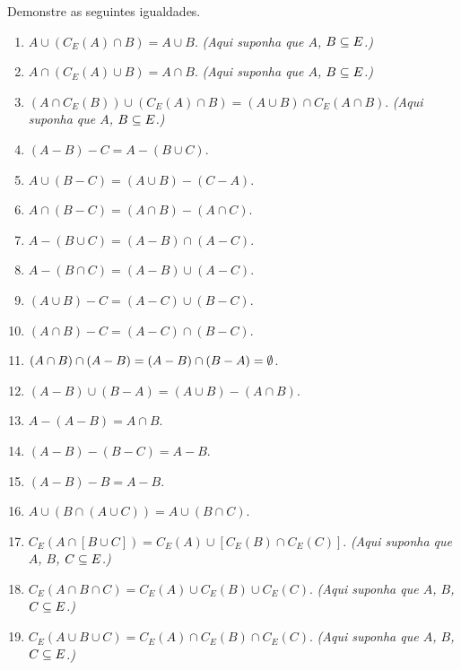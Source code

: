 \documentclass[12pt]{exam}
\begin{document}
\vspace{.3cm}

\questao{} Demonstre as seguintes igualdades.
\begin{enumerate}[label={\alph*})]
    \item $A \cup (C_E(A) \cap B) = A \cup B$. \textit{(Aqui suponha que $A$, $B \subseteq E$.)}

    \item $A \cap (C_E(A) \cup B) = A \cap B$. \textit{(Aqui suponha que $A$, $B \subseteq E$.)}

    \item $(A \cap C_E(B)) \cup (C_E(A) \cap B) = (A \cup B) \cap C_E(A \cap B)$. \textit{(Aqui suponha que $A$, $B \subseteq E$.)}
    \item $(A - B) - C = A - (B \cup C)$.

    \item $A \cup (B - C) = (A \cup B) - (C - A)$.

    \item $A \cap (B - C) = (A \cap B) - (A \cap C)$.

    \item $A - (B \cup C) = (A - B) \cap (A - C)$.

    \item $A - (B \cap C) = (A - B) \cup (A - C)$.

    \item $(A \cup B) - C = (A - C) \cup (B - C)$.

    \item $(A \cap B) - C = (A - C) \cap (B - C)$.

    \item $(A \cap B) \cap (A - B) = (A - B) \cap (B - A) = \emptyset$.

    \item $(A - B) \cup (B - A) = (A \cup B) - (A \cap B)$.

    \item $A - (A - B) = A \cap B$.

    \item $(A - B) - (B - C) = A - B$.

    \item $(A - B) - B = A - B$.

    \item $A \cup (B \cap (A \cup C)) = A \cup (B \cap C)$.

    \item $C_E( A \cap [B \cup C]) = C_E(A) \cup [C_E(B)\cap C_E(C)]$. \textit{(Aqui suponha que $A$, $B$, $C \subseteq E$.)}

    \item $C_E( A \cap B \cap C) = C_E(A) \cup C_E(B) \cup C_E(C)$. \textit{(Aqui suponha que $A$, $B$, $C \subseteq E$.)}

    \item $C_E( A \cup B \cup C) = C_E(A) \cap C_E(B) \cap C_E(C)$. \textit{(Aqui suponha que $A$, $B$, $C \subseteq E$.)}
\end{enumerate}
\end{document}
